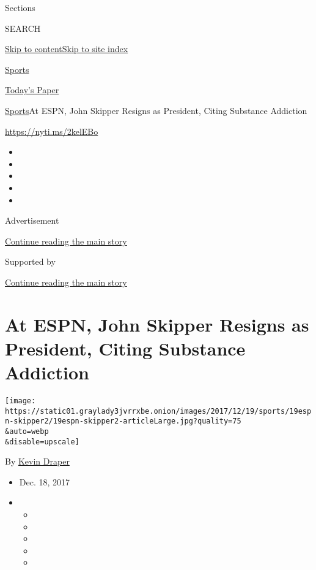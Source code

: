Sections

SEARCH

\protect\hyperlink{site-content}{Skip to
content}\protect\hyperlink{site-index}{Skip to site index}

\href{https://www.nytimes3xbfgragh.onion/section/sports}{Sports}

\href{https://myaccount.nytimes3xbfgragh.onion/auth/login?response_type=cookie\&client_id=vi}{}

\href{https://www.nytimes3xbfgragh.onion/section/todayspaper}{Today's
Paper}

\href{/section/sports}{Sports}\textbar{}At ESPN, John Skipper Resigns as
President, Citing Substance Addiction

\url{https://nyti.ms/2kelEBo}

\begin{itemize}
\item
\item
\item
\item
\item
\end{itemize}

Advertisement

\protect\hyperlink{after-top}{Continue reading the main story}

Supported by

\protect\hyperlink{after-sponsor}{Continue reading the main story}

\hypertarget{at-espn-john-skipper-resigns-as-president-citing-substance-addiction}{%
\section{At ESPN, John Skipper Resigns as President, Citing Substance
Addiction}\label{at-espn-john-skipper-resigns-as-president-citing-substance-addiction}}

\texttt{[image: https://static01.graylady3jvrrxbe.onion/images/2017/12/19/sports/19espn-skipper2/19espn-skipper2-articleLarge.jpg?quality=75\\\&auto=webp\\\&disable=upscale]}

By \href{https://www.nytimes3xbfgragh.onion/by/kevin-draper}{Kevin
Draper}

\begin{itemize}
\item
  Dec. 18, 2017
\item
  \begin{itemize}
  \item
  \item
  \item
  \item
  \item
  \end{itemize}
\end{itemize}

